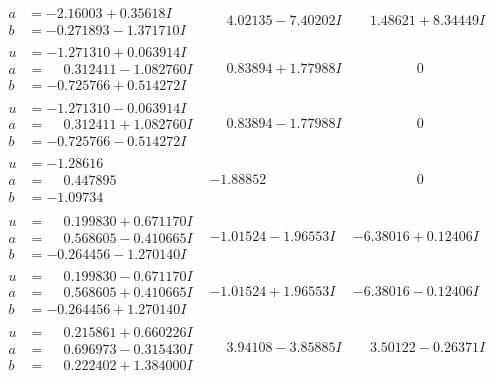 \documentclass[1p]{elsarticle_modified}
\theoremstyle{definition}
\begin{document}
$$\begin{array}{c|c|c}
\begin{aligned}
a &= -2.16003 + 0.35618 I \\
b &= -0.271893 - 1.371710 I\end{aligned}
 & \phantom{-}4.02135 - 7.40202 I & \phantom{-}1.48621 + 8.34449 I \\ \hline\begin{aligned}
u &= -1.271310 + 0.063914 I \\
a &= \phantom{-}0.312411 - 1.082760 I \\
b &= -0.725766 + 0.514272 I\end{aligned}
 & \phantom{-}0.83894 + 1.77988 I & \phantom{-0.000000 } 0 \\ \hline\begin{aligned}
u &= -1.271310 - 0.063914 I \\
a &= \phantom{-}0.312411 + 1.082760 I \\
b &= -0.725766 - 0.514272 I\end{aligned}
 & \phantom{-}0.83894 - 1.77988 I & \phantom{-0.000000 } 0 \\ \hline\begin{aligned}
u &= -1.28616\phantom{ +0.000000I} \\
a &= \phantom{-}0.447895\phantom{ +0.000000I} \\
b &= -1.09734\phantom{ +0.000000I}\end{aligned}
 & -1.88852\phantom{ +0.000000I} & \phantom{-0.000000 } 0 \\ \hline\begin{aligned}
u &= \phantom{-}0.199830 + 0.671170 I \\
a &= \phantom{-}0.568605 - 0.410665 I \\
b &= -0.264456 - 1.270140 I\end{aligned}
 & -1.01524 - 1.96553 I & -6.38016 + 0.12406 I \\ \hline\begin{aligned}
u &= \phantom{-}0.199830 - 0.671170 I \\
a &= \phantom{-}0.568605 + 0.410665 I \\
b &= -0.264456 + 1.270140 I\end{aligned}
 & -1.01524 + 1.96553 I & -6.38016 - 0.12406 I \\ \hline\begin{aligned}
u &= \phantom{-}0.215861 + 0.660226 I \\
a &= \phantom{-}0.696973 - 0.315430 I \\
b &= \phantom{-}0.222402 + 1.384000 I\end{aligned}
 & \phantom{-}3.94108 - 3.85885 I & \phantom{-}3.50122 - 0.26371 I \\ \hline\begin{aligned}

\end{aligned}
\end{array}$$
\end{document}
